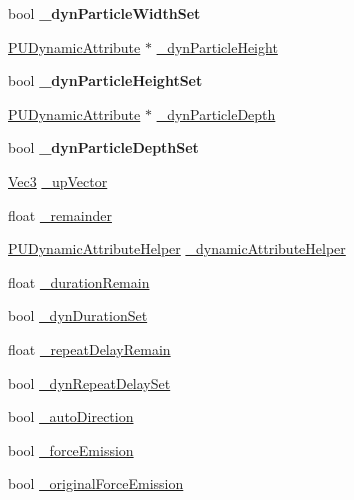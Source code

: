 \begin{DoxyCompactItemize}
\item 
\mbox{\label{classPUEmitter_ae1324759a8c7b21d0277234e483347d7}} 
bool {\bfseries \+\_\+dyn\+Particle\+Width\+Set}
\item 
\hyperlink{classPUDynamicAttribute}{P\+U\+Dynamic\+Attribute} $\ast$ \hyperlink{classPUEmitter_adbb061ee652191ccc7e15495dd32ddd6}{\+\_\+dyn\+Particle\+Height}
\item 
\mbox{\label{classPUEmitter_a46b84948ee3b6e2680cc8369db3b636a}} 
bool {\bfseries \+\_\+dyn\+Particle\+Height\+Set}
\item 
\hyperlink{classPUDynamicAttribute}{P\+U\+Dynamic\+Attribute} $\ast$ \hyperlink{classPUEmitter_a4bdaecbbf84d8f7bbf1d84bfe2d0a47d}{\+\_\+dyn\+Particle\+Depth}
\item 
\mbox{\label{classPUEmitter_a9cb60d8b2ef95c8d1ba0b1ee3dcfb5af}} 
bool {\bfseries \+\_\+dyn\+Particle\+Depth\+Set}
\item 
\hyperlink{classVec3}{Vec3} \hyperlink{classPUEmitter_af3b3eac3d9539b5c2d8597dfa41a17cb}{\+\_\+up\+Vector}
\item 
float \hyperlink{classPUEmitter_ac1115f1b0d7963dbe18d9812610ae16b}{\+\_\+remainder}
\item 
\hyperlink{classPUDynamicAttributeHelper}{P\+U\+Dynamic\+Attribute\+Helper} \hyperlink{classPUEmitter_a2bdf89257051384903ae1a4a783c9bb7}{\+\_\+dynamic\+Attribute\+Helper}
\item 
float \hyperlink{classPUEmitter_a61b7ec1702a2818f66086486c80a7def}{\+\_\+duration\+Remain}
\item 
bool \hyperlink{classPUEmitter_a3ff02b7481e73cef48215b3258e9d12b}{\+\_\+dyn\+Duration\+Set}
\item 
float \hyperlink{classPUEmitter_ad4f5d530832b33afb555fba214cf5864}{\+\_\+repeat\+Delay\+Remain}
\item 
bool \hyperlink{classPUEmitter_a45b6804e8951590737ec796caa3c4277}{\+\_\+dyn\+Repeat\+Delay\+Set}
\item 
bool \hyperlink{classPUEmitter_a9d726a310ce20bd3e5bc504b5d81e9f6}{\+\_\+auto\+Direction}
\item 
bool \hyperlink{classPUEmitter_adad1e10b1e1c001a5acd7b92934717b1}{\+\_\+force\+Emission}
\item 
bool \hyperlink{classPUEmitter_a6963cd32bcbff3c8a36284e858b38952}{\+\_\+original\+Force\+Emission}
\item 

\end{DoxyCompactItemize}
